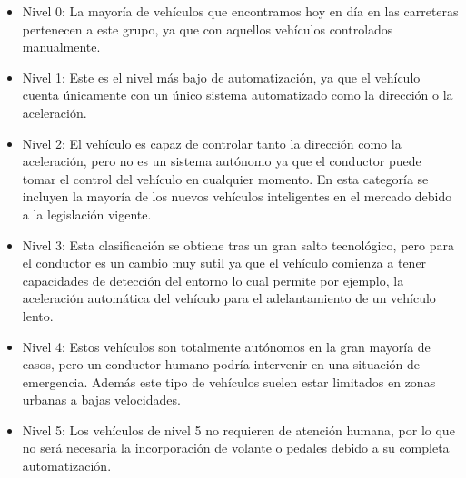 \begin{itemize}
    \item Nivel 0: La mayoría de vehículos que encontramos hoy en día en las carreteras pertenecen a este grupo, ya que con aquellos vehículos controlados manualmente.
    \item Nivel 1: Este es el nivel más bajo de automatización, ya que el vehículo cuenta únicamente con un único sistema automatizado como la dirección o la aceleración.
    \item Nivel 2: El vehículo es capaz de controlar tanto la dirección como la aceleración, pero no es un sistema autónomo ya que el conductor puede tomar el control del vehículo en cualquier momento. En esta categoría se incluyen la mayoría de los nuevos vehículos inteligentes en el mercado debido a la legislación vigente.
    \item Nivel 3: Esta clasificación se obtiene tras un gran salto tecnológico, pero para el conductor es un cambio muy sutil ya que el vehículo comienza a tener capacidades de detección del entorno lo cual permite por ejemplo, la aceleración automática del vehículo para el adelantamiento de un vehículo lento.
    \item Nivel 4: Estos vehículos son totalmente autónomos en la gran mayoría de casos, pero un conductor humano podría intervenir en una situación de emergencia. Además este tipo de vehículos suelen estar limitados en zonas urbanas a bajas velocidades.
    \item Nivel 5: Los vehículos de nivel 5 no requieren de atención humana, por lo que no será necesaria la incorporación de volante o pedales debido a su completa automatización.
\end{itemize}

